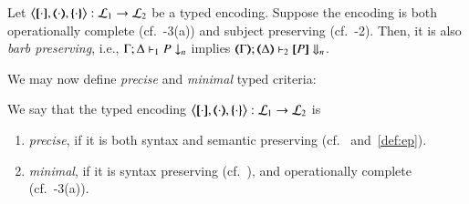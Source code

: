 \begin{proposition}\label{p:barbpres}
Let
	$\enco{\map{\cdot}, \mapt{\cdot}, \mapa{\cdot}}: \tyl{L}_1 \to \tyl{L}_2$
	be a typed encoding.
	Suppose the encoding is both
 operationally complete (cf.~-3(a)) 
 and subject preserving (cf.~-2).
 Then, it is also \emph{barb preserving}, i.e., 
$\Gamma; \Delta \vdash_1 P \downarrow_{n}$
implies
$\mapt{\Gamma}; \mapt{\Delta} \proves_2 \map{P} \Barb{n}$.
\end{proposition}

\smallskip 


We may now define \emph{precise} and \emph{minimal} typed criteria: 

\smallskip 

\begin{definition}\rm\label{def:goodenc}
We say that 
	the typed encoding 
	$\enco{\map{\cdot}, \mapt{\cdot}, \mapa{\cdot}}: \tyl{L}_1 \to \tyl{L}_2$ is 
	\begin{enumerate}[$\bullet$]
	\item \emph{precise}, if it is both syntax and semantic preserving (cf.~ and~\ref{def:ep}).
	\item \emph{minimal}, if it is syntax preserving 
	(cf.~),
	and operationally complete (cf.~-3(a)).
	\end{enumerate}
\end{definition}


